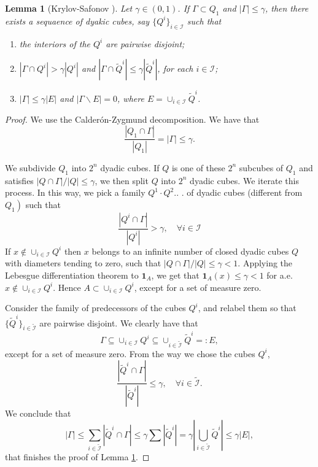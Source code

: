 \documentclass[twoside, 12pt]{book}
\numberwithin{equation}{chapter}
\newtheorem{lemma}[theorem]{Lemma}
\def\cI{{\mathcal I}}
\def\leq{\leqslant}
\def\1{{\mathbf{1}}}
\begin{document}
	
	\begin{lemma}[Krylov-Safonov \cite{krylov1979estimate}]\label{lem:CZ}
		Let $\gamma\in (0,1)$. If $\Gamma\subset Q_1$ and $|\Gamma|\leq \gamma$, then there exists a sequaence of dyakic cubes, say $\{Q^i\}_{i\in \cI}$ such that 
		\begin{enumerate}
			\item the interiors of the $Q^i$ are pairwise disjoint; 
			\item $|\Gamma \cap Q^i|>\gamma |Q^i|$ and $|\Gamma \cap \widetilde{Q}^i|\leq \gamma |\widetilde{Q}^i|$, for each $i\in \cI$; 
			\item $|\Gamma|\leq \gamma |E|$ and $|\Gamma \backslash E|=0$, where $E=\cup_{i\in \cI} \widetilde{Q}^i$. 
		\end{enumerate}
	\end{lemma}
\begin{proof}
    We use the Calderón-Zygmund decomposition. We have that
$$
\frac{\left|Q_1 \cap \Gamma\right|}{\left|Q_1\right|}=|\Gamma| \leq \gamma.
$$

We subdivide $Q_1$ into $2^n$ dyadic cubes. If $Q$ is one of these $2^n$ subcubes of $Q_1$ and satisfies $|Q \cap \Gamma| /|Q| \leq \gamma$, we then split $Q$ into $2^n$ dyadic cubes. We iterate this process. In this way, we pick a family $Q^1 \cdot Q^2$.. . of dyadic cubes (different from $\left.Q_1\right)$ such that
$$
\frac{\left|Q^i \cap \Gamma\right|}{\left|Q^i\right|}>\gamma, \quad \forall i\in \cI
$$
If $x \notin \cup_{i\in \cI} Q^i$ then $x$ belongs to an infinite number of closed dyadic cubes $Q$ with diameters tending to zero, such that $|Q \cap \Gamma| /|Q| \leq \gamma<1$. Applying the Lebesgue differentiation theorem to $\1_A$, we get that $\1_A(x) \leq \gamma<1$ for a.e. $x \notin \cup_{i\in \cI} Q^i$. Hence $A \subset \cup_{i\in \cI} Q^i$, except for a set of measure zero.

Consider the family of predecessors of the cubes $Q^i$, and relabel them so that $\{\widetilde{Q}^i\}_{i \in \widetilde{\cI}}$ are pairwise disjoint. We clearly have that 
\[
    \Gamma \subseteq \cup_{i \in \cI} Q^i \subseteq \cup_{i \in \widetilde{\cI}} \widetilde{Q}^i=: E, 
\]
except for a set of measure zero. From the way we chose the cubes $Q^i$,
$$
\frac{\left|\widetilde{Q}^i \cap \Gamma\right|}{\left|\widetilde{Q}^i\right|} \leq \gamma, \quad \forall i\in \widetilde{\cI}.
$$
We conclude that
$$
|\Gamma| \leq \sum_{i\in \widetilde{\cI}}\left|\widetilde{Q}^i \cap \Gamma\right| \leq \gamma \sum\left|\widetilde{Q}^i\right|=\gamma\left|\bigcup _{i\in\widetilde{\cI}}\widetilde{Q}^i\right| \leq \gamma|E|,
$$
that finishes the proof of Lemma \ref{lem:CZ}. 
\end{proof}
 
\end{document}
